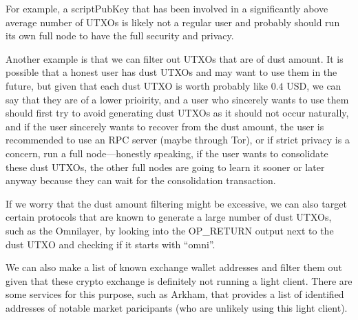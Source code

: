 For example, a scriptPubKey that has been involved in a significantly above average number of UTXOs is likely not a regular user and probably should run its own full node to have the full security and privacy.

Another example is that we can filter out UTXOs that are of dust amount. It is possible that a honest user has dust UTXOs and may want to use them in the future, but given that each dust UTXO is worth probably like $0.4$ USD, we can say that they are of a lower prioirity, and a user who sincerely wants to use them should first try to avoid generating dust UTXOs as it should not occur naturally, and if the user sincerely wants to recover from the dust amount, the user is recommended to use an RPC server (maybe through Tor), or if strict privacy is a concern, run a full node---honestly speaking, if the user wants to consolidate these dust UTXOs, the other full nodes are going to learn it sooner or later anyway because they can wait for the consolidation transaction.

If we worry that the dust amount filtering might be excessive, we can also target certain protocols that are known to generate a large number of dust UTXOs, such as the Omnilayer, by looking into the \textrm{OP\_RETURN} output next to the dust UTXO and checking if it starts with ``omni''.

We can also make a list of known exchange wallet addresses and filter them out given that these crypto exchange is definitely not running a light client. There are some services for this purpose, such as Arkham, that provides a list of identified addresses of notable market paricipants (who are unlikely using this light client).
